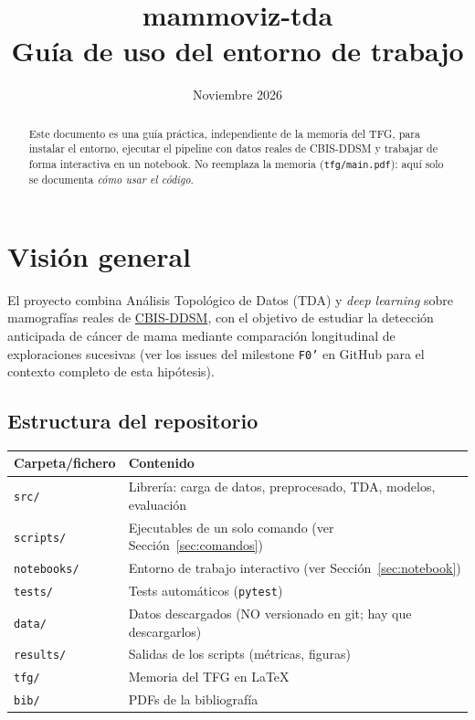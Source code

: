 \documentclass[11pt,a4paper]{article}
\title{\textbf{mammoviz-tda}\\[4pt]\large Guía de uso del entorno de trabajo}
\author{}
\date{Noviembre 2026}
\begin{document}
\maketitle
\thispagestyle{empty}

\begin{abstract}
\noindent Este documento es una guía práctica, independiente de la memoria
del TFG, para instalar el entorno, ejecutar el pipeline con datos reales de
CBIS-DDSM y trabajar de forma interactiva en un notebook. No reemplaza la
memoria (\texttt{tfg/main.pdf}): aquí solo se documenta \emph{cómo usar el
código}.
\end{abstract}

\tableofcontents

\section{Visión general}

El proyecto combina Análisis Topológico de Datos (TDA) y \textit{deep
learning} sobre mamografías reales de \href{https://www.cancerimagingarchive.net/collection/cbis-ddsm/}{CBIS-DDSM},
con el objetivo de estudiar la detección anticipada de cáncer de mama mediante
comparación longitudinal de exploraciones sucesivas (ver los issues del
milestone \texttt{F0'} en GitHub para el contexto completo de esta hipótesis).

\subsection{Estructura del repositorio}

\begin{center}
\begin{tabular}{@{}ll@{}}
\toprule
\textbf{Carpeta/fichero} & \textbf{Contenido} \\
\midrule
\texttt{src/} & Librería: carga de datos, preprocesado, TDA, modelos, evaluación \\
\texttt{scripts/} & Ejecutables de un solo comando (ver Sección~\ref{sec:comandos}) \\
\texttt{notebooks/} & Entorno de trabajo interactivo (ver Sección~\ref{sec:notebook}) \\
\texttt{tests/} & Tests automáticos (\texttt{pytest}) \\
\texttt{data/} & Datos descargados (NO versionado en git; hay que descargarlos) \\
\texttt{results/} & Salidas de los scripts (métricas, figuras) \\
\texttt{tfg/} & Memoria del TFG en LaTeX \\
\texttt{bib/} & PDFs de la bibliografía \\
\bottomrule
\end{tabular}
\end{center}
\end{document}
